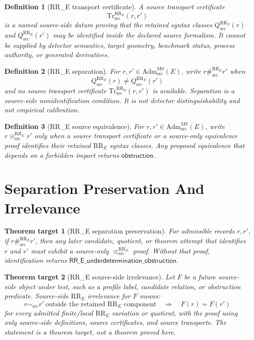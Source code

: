 \documentclass[11pt]{article}
\newcommand{\AdmSrc}{\mathrm{Adm}^{\mathrm{MS}}_{\mathrm{src}}}
\newcommand{\RRE}{\mathrm{RR}_E}
\newcommand{\Qsrc}{Q^{\RRE}_{\mathrm{src}}}
\newcommand{\EqRR}{\equiv^{\RRE}_{\mathrm{src}}}
\newcommand{\SepRR}{\#^{\RRE}_{\mathrm{src}}}
\newcommand{\TrRR}{\mathrm{Tr}^{\RRE}_{\mathrm{src}}}
\newcommand{\Obstruction}{\mathsf{obstruction}}
\newcommand{\RRUnder}{\mathsf{RR\_E\_underdetermination\_obstruction}}
\newtheorem{definition}{Definition}
\newtheorem{target}{Theorem target}
\begin{document}
\begin{definition}[RR\_E transport certificate]
A source transport certificate
\[
  \TrRR(r,r')
\]
is a named source-side datum proving that the retained syntax classes
\(\Qsrc(r)\) and \(\Qsrc(r')\) may be identified inside the declared source
formalism. It cannot be supplied by detector semantics, target geometry,
benchmark status, process authority, or generated derivatives.
\end{definition}

\begin{definition}[RR\_E separation]
For \(r,r'\in\AdmSrc(E)\), write \(r\SepRR r'\) when
\[
  \Qsrc(r)\ne \Qsrc(r')
\]
and no source transport certificate \(\TrRR(r,r')\) is available. Separation
is a source-side nonidentification condition. It is not detector
distinguishability and not empirical calibration.
\end{definition}

\begin{definition}[RR\_E source equivalence]
For \(r,r'\in\AdmSrc(E)\), write \(r\EqRR r'\) only when a source transport
certificate or a source-only equivalence proof identifies their retained
\(\RRE\) syntax classes. Any proposed equivalence that depends on a forbidden
import returns \(\Obstruction\).
\end{definition}

\section{Separation Preservation And Irrelevance}

\begin{target}[RR\_E separation preservation]
For admissible records \(r,r'\), if \(r\SepRR r'\), then any later
candidate, quotient, or theorem attempt that identifies \(r\) and \(r'\) must
exhibit a source-only \(\EqRR\) proof. Without that proof, identification
returns \(\RRUnder\).
\end{target}

\begin{target}[RR\_E source-side irrelevance]
Let \(F\) be a future source-side object under test, such as a profile label,
candidate relation, or obstruction predicate. Source-side \(\RRE\)
irrelevance for \(F\) means:
\[
  r \sim_{\mathrm{src}} r'
  \ \text{outside the retained \(\RRE\) component}
  \quad \Longrightarrow \quad
  F(r)=F(r')
\]
for every admitted finite/local \(\RRE\) variation or quotient, with the proof
using only source-side definitions, source certificates, and source
transports. The statement is a theorem target, not a theorem proved here.
\end{target}
\end{document}
